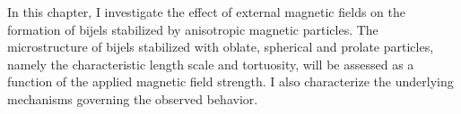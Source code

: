 In this chapter, I investigate the effect of external magnetic fields on the formation of bijels stabilized by 
anisotropic magnetic particles. The microstructure of bijels stabilized with oblate, spherical and prolate particles, 
namely the characteristic length scale and tortuosity, will be assessed as a function of the applied magnetic field
strength. I also characterize the underlying mechanisms governing the observed behavior. 


